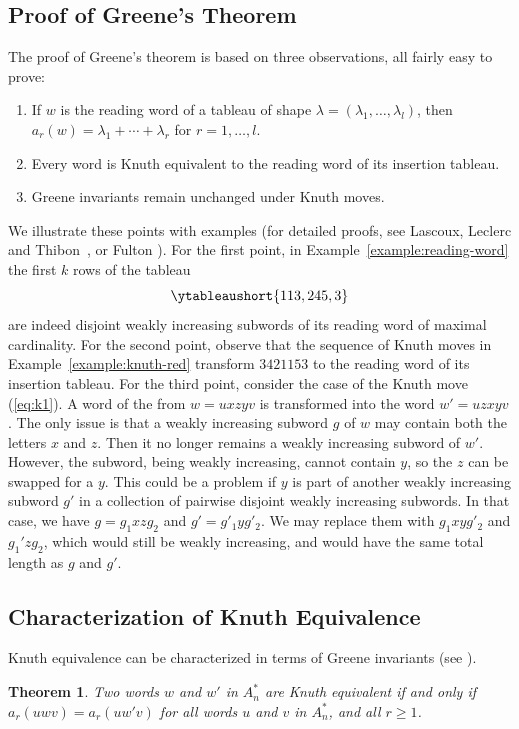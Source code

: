 \documentclass[10pt]{amsproc}
\newtheorem{theorem}{Theorem}[subsection]
\theoremstyle{definition}
\theoremstyle{remark}
\begin{document}
\subsection{Proof of Greene's Theorem}
\label{sec:proof-greene}
The proof of Greene's theorem is based on three observations, all fairly easy to prove:
\begin{enumerate}
\item If $w$ is the reading word of a tableau of shape $\lambda=(\lambda_1,\dotsc,\lambda_l)$, then $a_r(w)=\lambda_1+\dotsb + \lambda_r$ for $r=1,\dotsc,l$.
\item Every word is Knuth equivalent to the reading word of its insertion tableau.
\item Greene invariants remain unchanged under Knuth moves.
\end{enumerate}
We illustrate these points with examples (for detailed proofs, see Lascoux, Leclerc and Thibon~\cite{Lascoux}, or Fulton \cite{fulton}).
For the first point, in Example~\ref{example:reading-word} the first $k$ rows of the tableau
\begin{displaymath}
  \ytableaushort{113,245,3}
\end{displaymath}
are indeed disjoint weakly increasing subwords of its reading word of maximal cardinality.
For the second point, observe that the sequence of Knuth moves in Example~\ref{example:knuth-red} transform $3421153$ to the reading word of its insertion tableau.
For the third point, consider the case of the Knuth move (\ref{eq:k1}).
A word of the from $w=uxzyv$ is transformed into the word $w'=uzxyv$.
The only issue is that a weakly increasing subword $g$ of $w$ may contain both the letters $x$ and $z$.
Then it no longer remains a weakly increasing subword of $w'$.
However, the subword, being weakly increasing, cannot contain $y$, so the $z$ can be swapped for a $y$.
This could be a problem if $y$ is part of another weakly increasing subword $g'$ in a collection of pairwise disjoint weakly increasing subwords.
In that case, we have $g=g_1xzg_2$ and $g'=g'_1y g'_2$.
We may replace them with $g_1xyg'_2$ and $g_1'zg_2$, which would still be weakly increasing, and would have the same total length as $g$ and $g'$.
\subsection{Characterization of Knuth Equivalence}
\label{sec:characterization}
Knuth equivalence can be characterized in terms of Greene invariants (see \cite[Theorem~2.15]{plaxique}).
\begin{theorem}
  Two words $w$ and $w'$ in $A_n^*$ are Knuth equivalent if and only if $a_r(uwv)=a_r(uw'v)$ for all words $u$ and $v$ in $A_n^*$, and all $r\geq 1$.
\end{theorem}
\end{document}
